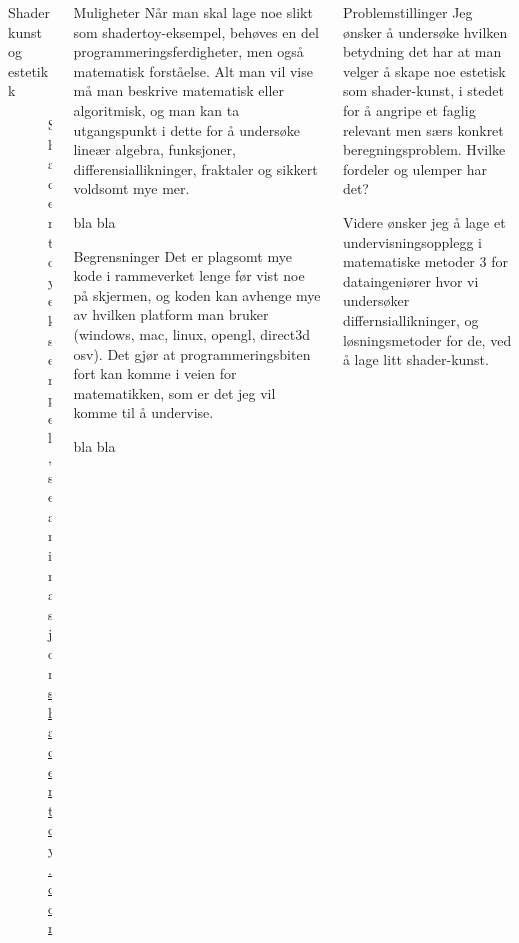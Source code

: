 \documentclass[]{beamer}
\begin{document}
\begin{frame}[t]
\begin{columns}
\begin{column}{0.33\textwidth}
\begin{block}{Shader kunst og estetikk}
         \end{block}
         \begin{figure}[ht]
            \centering
            \caption{Shadertoy eksempel, se animasjon \href{https://www.shadertoy.com/}{shadertoy.com}}
            \label{shadertoy}
         \end{figure}
      \end{column}
      
      \begin{column}{0.33\textwidth}
         \begin{block}{Muligheter}
            Når man skal lage noe slikt som shadertoy-eksempel, behøves en del programmeringsferdigheter, men også matematisk forståelse.
            Alt man vil vise må man beskrive matematisk eller algoritmisk, og man kan ta utgangspunkt i dette 
            for å undersøke lineær algebra, funksjoner, differensiallikninger, fraktaler og sikkert voldsomt mye mer.
            
            \color{NTNUgrey}\lipsum[1]bla bla \autocite{gascoigne2014tacit}
         \end{block}
         \begin{block}{Begrensninger}
            Det er plagsomt mye kode i rammeverket lenge før vist noe på skjermen, og koden kan avhenge mye av hvilken platform man bruker (windows, mac, linux, opengl, direct3d osv).
            Det gjør at programmeringsbiten fort kan komme i veien for matematikken, som er det jeg vil komme til å undervise.
            
            \color{NTNUgrey}\lipsum[1]
            \lipsum[1]bla bla \autocite{gascoigne2014tacit}
         \end{block}
      \end{column}
      
      \begin{column}{0.33\textwidth}
         \begin{block}{Problemstillinger}
            Jeg ønsker å undersøke hvilken betydning det har at man velger å skape noe estetisk som shader-kunst, i stedet for å angripe et faglig relevant men særs konkret beregningsproblem.
            Hvilke fordeler og ulemper har det?

            Videre ønsker jeg å lage et undervisningsopplegg i matematiske metoder 3 for dataingeniører hvor vi undersøker differnsiallikninger, og løsningsmetoder for de, ved å lage litt shader-kunst.
            

\end{block}
\end{column}
\end{columns}
\end{frame}
\end{document}
